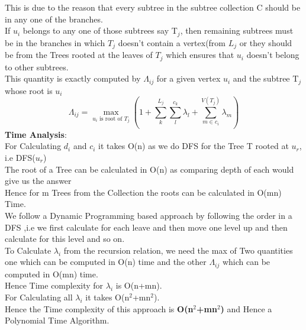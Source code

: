 \documentclass{report}
\begin{document}
 This is due to the reason that every subtree in the subtree collection C should be in any one of the branches.\\
 If $u_i$ belongs to any one of those subtrees say T$_j$, then remaining subtrees must be in the branches in which $T_j$ doesn't contain a vertex(from $L_j$ or they should be from the Trees rooted at the leaves of $T_j$ which ensures that $u_i$ doesn't belong to other subtrees.\\
 This quantity is exactly computed by $\Lambda_{ij}$ for a given vertex $u_i$ and the subtree T$_j$ whose root is $u_i$\\
 \begin{equation*}
     \Lambda_{ij} = \max_{u_i\text{ is root of }T_j }(1 + \sum_k^{L_j}\sum_l^{c_k} \lambda_l + \sum_{m \in c_i}^{V(T_j)} \lambda_m)
 \end{equation*}
 \textbf{Time Analysis}:\\
 
 For Calculating $d_i$ and $c_i$ it takes O(n) as we do DFS for the Tree T rooted at $u_r$, i.e DFS($u_r$)\\
 The root of a Tree can be calculated in O(n) as comparing depth of each would give us the answer\\
 Hence for m Trees from the Collection the roots can be calculated in O(mn) Time.\\
 We follow a Dynamic Programming based approach by following the order in a DFS ,i.e we first calculate for each leave and then move one level up and then calculate for this level and so on.\\
 To Calculate $\lambda_i$ from the recursion relation, we need the max of Two quantities one which can be computed in O(n) time and the other $\Lambda_{ij}$ which can be computed in O(mn) time.\\
 Hence Time complexity for $\lambda_i$ is O(n+mn).\\
 For Calculating all $\lambda_i$ it takes O(n$^2$+mn$^2$).\\
 Hence the Time complexity of this approach is \textbf{O(n$^2$+mn$^2$)} and Hence a Polynomial Time Algorithm.\\
 
\end{document}
